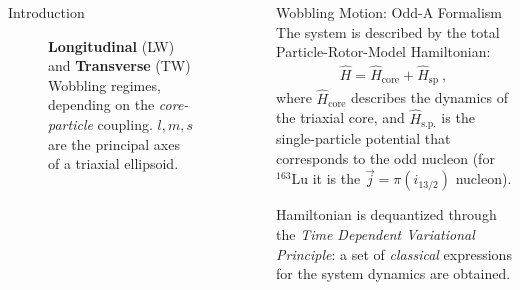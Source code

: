 \documentclass[final]{beamer}
\newlength{\sepwidth}
\newlength{\colwidth}
\newcommand{\separatorcolumn}{\begin{column}{\sepwidth}\end{column}}
\begin{document}
\begin{frame}[t]
\begin{columns}[t]
\begin{column}{\colwidth}
\begin{block}{Introduction}
\begin{figure}
      \caption{\textbf{Longitudinal} (LW) and \textbf{Transverse} (TW) Wobbling regimes, depending on the \emph{core-particle} coupling. $l,m,s$ are the principal axes of a triaxial ellipsoid.}
      \label{tw-lw-wobbling}
  \end{figure}
  \end{block}
\end{column}
\separatorcolumn
\begin{column}{\colwidth}
  \begin{block}{Wobbling Motion: Odd-A Formalism}
The system is described by the total Particle-Rotor-Model Hamiltonian:
\begin{align}
    \hat{H}=\hat{H}_\text{core}+\hat{H}_\text{sp}\ ,
\end{align}
where $\hat{H}_\text{core}$ describes the dynamics of the triaxial core, and $\hat{H}_\text{s.p.}$ is the single-particle potential that corresponds to the odd nucleon (for $^{163}$Lu it is the $\vec{j}=\pi(i_{13/2})$ nucleon).

Hamiltonian is dequantized through the \emph{Time Dependent Variational Principle}: a set of \emph{classical} expressions for the system dynamics are obtained.


\end{block}
\end{column}
\end{columns}
\end{frame}
\end{document}
